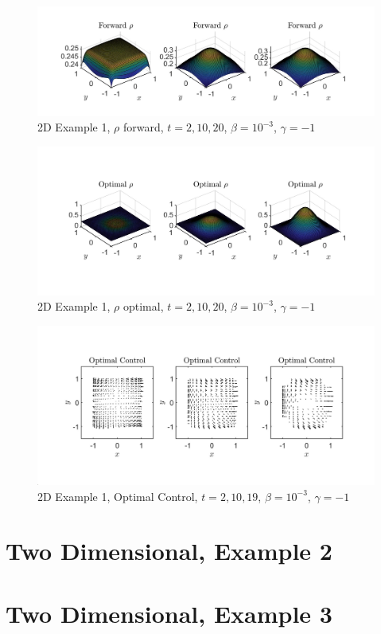 \documentclass[11pt, a4paper]{article}
\theoremstyle{definition}
\begin{document}
\begin{figure}[h]
	\includegraphics[scale=0.3]{FWrho2Dgn1.jpg}
	\caption{2D Example 1, $\rho$ forward, $t= 2,10,20$, $\beta = 10^{-3}$, $\gamma = -1$}
	\label{Fig2D4}
\end{figure}
\begin{figure}[h]
	\includegraphics[scale=0.3]{Optrho2Dgn1.jpg}
	\caption{2D Example 1, $\rho$ optimal, $t= 2,10,20$, $\beta = 10^{-3}$, $\gamma = -1$}
	\label{Fig2D5}
\end{figure}
\begin{figure}[h]
	\includegraphics[scale=0.3]{OC2Dgn1.jpg}
	\caption{2D Example 1, Optimal Control, $t= 2,10,19$, $\beta = 10^{-3}$, $\gamma = -1$}
	\label{Fig2D6}
\end{figure}

\section{Two Dimensional, Example 2}

\section{Two Dimensional, Example 3}
\end{document}
